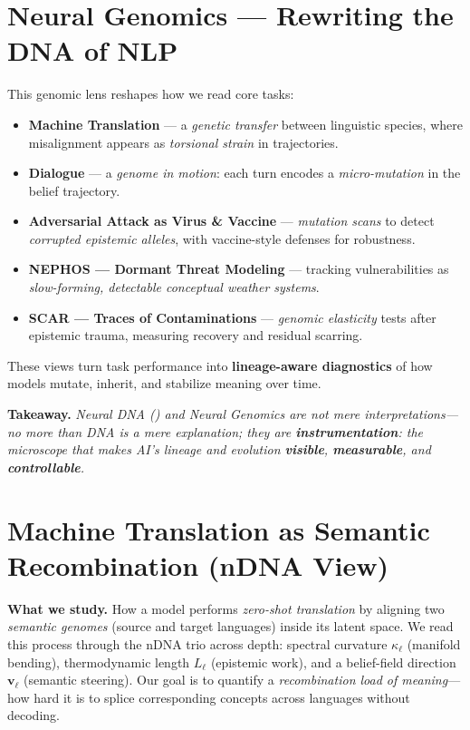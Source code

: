 \section*{Neural Genomics --- Rewriting the DNA of NLP}
This genomic lens reshapes how we read core tasks:
\begin{itemize}[leftmargin=2em,itemsep=1pt,parsep=0pt,topsep=0pt]
  \item \textbf{Machine Translation} --- a \emph{genetic transfer} between linguistic species, where misalignment appears as \emph{torsional strain} in \ndna{} trajectories.
  \item \textbf{Dialogue} --- a \emph{genome in motion}: each turn encodes a \emph{micro-mutation} in the belief trajectory.
  \item \textbf{Adversarial Attack as Virus \& Vaccine} --- \emph{mutation scans} to detect \emph{corrupted epistemic alleles}, with vaccine-style defenses for robustness.
  \item \textbf{NEPHOS --- Dormant Threat Modeling} --- tracking vulnerabilities as \emph{slow-forming, detectable conceptual weather systems}.
  \item \textbf{SCAR --- Traces of Contaminations} --- \emph{genomic elasticity} tests after epistemic trauma, measuring recovery and residual scarring.
\end{itemize}
These views turn task performance into \textbf{lineage-aware diagnostics} of how models mutate, inherit, and stabilize meaning over time.

\medskip
\noindent
\textbf{Takeaway.} \emph{Neural DNA (\ndna{}) and Neural Genomics are not mere interpretations---no more than DNA is a mere explanation; they are \textbf{instrumentation}: the microscope that makes AI's lineage and evolution \textbf{visible}, \textbf{measurable}, and \textbf{controllable}.}




\clearpage
\newpage

\section*{Machine Translation as Semantic Recombination (nDNA View)}
\noindent\textbf{What we study.} How a model performs \emph{zero-shot translation} by aligning two \emph{semantic genomes} (source and target languages) inside its latent space. We read this process through the nDNA trio across depth: spectral curvature $\kappa_\ell$ (manifold bending), thermodynamic length $L_\ell$ (epistemic work), and a belief-field direction $\mathbf v_\ell$ (semantic steering). Our goal is to quantify a \emph{recombination load of meaning}---how hard it is to splice corresponding concepts across languages without decoding.

